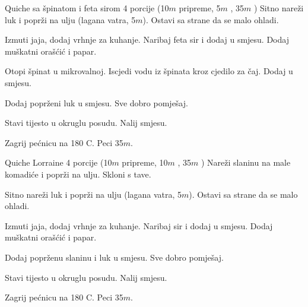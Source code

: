 \documentclass[a4paper]{article}
\begin{document}
\renewcommand*{\recipestepnumberfont}{\small\itshape}

\begin{recipe}{Quiche sa špinatom i feta sirom}%
  {4 porcije}%
  { (10$m$ pripreme, 5$m$ \fryingpan, 35$m$ \oven) \textleaf}
  Sitno nareži luk i poprži na ulju (lagana vatra, 5$m$). Ostavi sa strane da
  se malo ohladi.

  Izmuti jaja, dodaj vrhnje za kuhanje. Naribaj feta sir i dodaj u smjesu.
  Dodaj muškatni orašćić i papar.

  Otopi špinat u mikrovalnoj. Iscjedi vodu iz špinata kroz cjedilo za čaj.
  Dodaj u smjesu.

\newstep
  Dodaj poprženi luk u smjesu. Sve dobro pomješaj.

  Stavi tijesto u okruglu posudu. Nalij smjesu.

\ingredient[]{}{\oven}
  Zagrij pećnicu na 180\0 C. Peci 35$m$.

\end{recipe}

\begin{recipe}{Quiche Lorraine}%
  {4 porcije}%
  { (10$m$ pripreme, 10$m$ \fryingpan, 35$m$ \oven)}
  Nareži slaninu na male komadiće i poprži na ulju. Skloni s tave.

  Sitno nareži luk i poprži na ulju (lagana vatra, 5$m$). Ostavi sa strane da
  se malo ohladi.

  Izmuti jaja, dodaj vrhnje za kuhanje. Naribaj sir i dodaj u smjesu.
  Dodaj muškatni orašćić i papar.

\newstep
  Dodaj poprženu slaninu i luk u smjesu. Sve dobro pomješaj.

  Stavi tijesto u okruglu posudu. Nalij smjesu.

\ingredient[]{}{\oven}
  Zagrij pećnicu na 180\0 C. Peci 35$m$.

\end{recipe}
\end{document}
